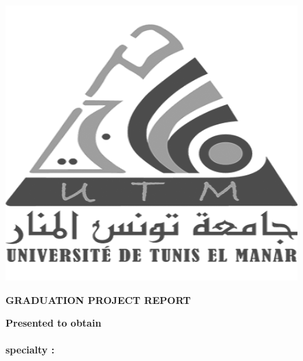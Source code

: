 \hfill
\begin{minipage}[l]{0.02\columnwidth}
\end{minipage}
\hfill
\begin{minipage}[l]{0.18\columnwidth}
\vspace{6mm}
\includegraphics[width=0.9\columnwidth]{Logo_UTM_Black}\\
\end{minipage}
\vskip1.5cm

\begin{center}
{\LARGE{\textbf{\textsc{GRADUATION PROJECT REPORT}}}}\\
\vskip0.5cm
\large

{\textbf{Presented to obtain}}\\
\vskip2mm
{\textbf{\@diplomaName}}\\
{\textbf{specialty : \@speciality}}\\
{}
\end{center}

